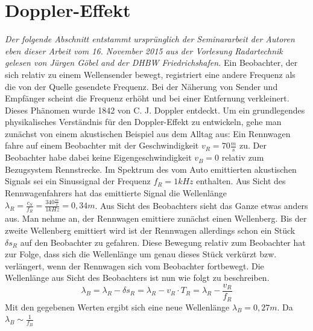 \section{Doppler-Effekt}
\label{sec:doppler}
\textit{Der folgende Abschnitt entstammt ursprünglich der Seminararbeit der Autoren eben dieser Arbeit vom 16. November 2015 aus der Vorlesung Radartechnik gelesen von Jürgen Göbel and der DHBW Friedrichshafen.} 
\newpar
Ein Beobachter, der sich relativ zu einem Wellensender bewegt, registriert 
eine andere Frequenz als die von der Quelle gesendete Frequenz. Bei der 
Näherung von Sender und Empfänger scheint die Frequenz erhöht und bei einer 
Entfernung verkleinert. Dieses Phänomen wurde 1842 von C. J. Doppler entdeckt. 
\newpar
Um ein grundlegendes  physikalisches Verständnis für den Doppler-Effekt zu entwickeln, 
gehe man zunächst von einem akustischen Beispiel aus dem Alltag aus: Ein Rennwagen fahre auf einem Beobachter 
mit der Geschwindigkeit \begin{math}v_R=70 \frac{m}{s}\end{math} zu. Der Beobachter habe dabei 
keine Eigengeschwindigkeit \begin{math}v_B=0 \end{math} relativ zum Bezugsystem Rennstrecke. Im 
Spektrum des vom Auto emittierten akustischen Signals sei ein Sinussignal der Frequenz \begin{math}f_R=1kHz\end{math} 
enthalten. Aus Sicht des Rennwagenfahrers hat das emittierte Signal die Wellenlänge
\begin{math}\lambda_R=\frac{c_S}{f_R}=\frac{340\frac{m}{s}}{1kHz}=0,34m\end{math}.
Aus Sicht des Beobachters sieht das Ganze etwas anders aus. 
Man nehme an, der Rennwagen emittiere zunächst einen Wellenberg.
Bis der zweite Wellenberg emittiert wird ist der Rennwagen allerdings schon ein Stück \begin{math}\delta s_R\end{math} auf den Beobachter zu gefahren. Diese Bewegung relativ
zum Beobachter hat zur Folge, dass sich die Wellenlänge um genau dieses Stück verkürzt bzw. verlängert, wenn der Rennwagen sich vom Beobachter fortbewegt.
Die Wellenlänge aus Sicht des Beobachters ist nun wie folgt zu beschreiben.
\begin{equation}
\label{lambda_b}
\lambda_B=\lambda_R -\delta s_{R}=\lambda_R - v_R \cdot T_{R}=\lambda_R - \frac{v_R}{f_{R}}
\end{equation} 
Mit den gegebenen Werten ergibt sich eine neue Wellenlänge \begin{math}{\lambda_B=0,27m} \end{math}. Da \begin{math}{\lambda_B \sim \frac{1}{f_B}} \end{math}  
